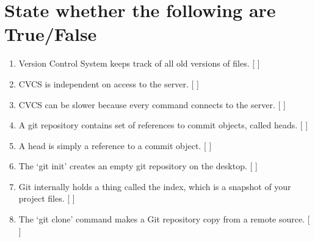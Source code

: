 \documentclass[11pt,a4paper]{article}
\begin{document}
\section*{State whether the following are True/False}
\begin{enumerate}\itemsep2pt
\item Version Control System keeps track of all old versions of files. [   ]
\item CVCS is independent on access to the server. [   ]
\item CVCS can be slower because every command connects to the server. [   ]
\item A git repository contains set of references to commit objects, called heads. [   ]
\item A head is simply a reference to a commit object. [   ]
\item The `git init' creates an empty git repository on the desktop. [  ]
\item Git internally holds a thing called the index, which is a snapshot of
your project files. [   ]
\item The `git clone' command makes a Git repository copy from a remote
source. [   ]
\end{enumerate}
\end{document}
